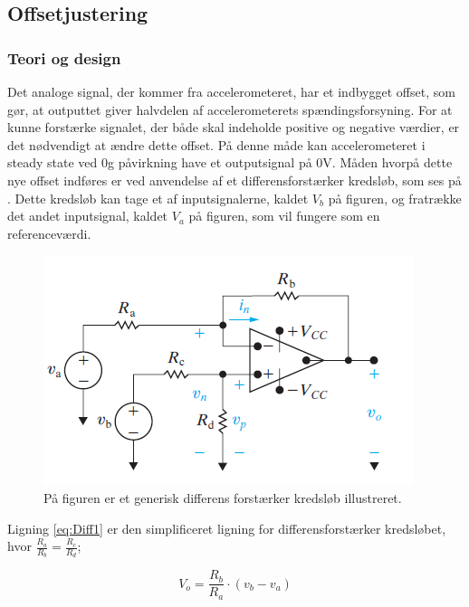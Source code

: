 \subsection{Offsetjustering}
\subsubsection{Teori og design} \label{Offset_Teori_Design}
Det analoge signal, der kommer fra accelerometeret, har et indbygget offset, som gør, at outputtet giver halvdelen af accelerometerets spændingsforsyning. For at kunne forstærke signalet, der både skal indeholde positive og negative værdier, er det nødvendigt at ændre dette offset. På denne måde kan  accelerometeret i steady state ved $0$g påvirkning have et outputsignal på $0$V. Måden hvorpå dette nye offset indføres er ved anvendelse af et differensforstærker kredsløb, som ses på . Dette kredsløb kan tage et af inputsignalerne, kaldet $V_{b}$ på figuren, og  fratrække det andet inputsignal, kaldet $V_{a}$ på figuren, som vil fungere som en referenceværdi.

\begin{figure}[H]
\centering
\includegraphics[scale=1.3]{figures/cProblemloesning/Differensforstaerker_generisk.png}
\caption{På figuren er et generisk differens forstærker kredsløb illustreret. \cite{Nilsson2011}}
\label{fig:Differensforstaerker_generisk}
\end{figure}

\noindent Ligning \ref{eq:Diff1} er den simplificeret ligning for differensforstærker kredsløbet, hvor $\frac{R_a}{R_b} = \frac{R_c}{R_d}$;

\begin{equation}\label{eq:Diff1}
V_o = \frac{R_b}{R_a} \cdot (v_b - v_a)
\end{equation}

